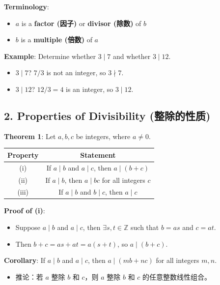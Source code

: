 \documentclass[10pt,a4paper,openany]{ctexbook}
\theoremstyle{definition}
\theoremstyle{remark}
\begin{document}
\textbf{Terminology}:
\begin{itemize}
\item $a$ is a \textbf{factor (因子)} or \textbf{divisor (除数)} of $b$
\item $b$ is a \textbf{multiple (倍数)} of $a$

\end{itemize}

\textbf{Example}: Determine whether $3 \mid 7$ and whether $3 \mid 12$.
\begin{itemize}
\item $3 \mid 7$? $7/3$ is not an integer, so $3 \nmid 7$.
\item $3 \mid 12$? $12/3 = 4$ is an integer, so $3 \mid 12$.

\end{itemize}

\vspace{-2pt}

\subsection{2. Properties of Divisibility (整除的性质)}

\textbf{Theorem 1}: Let $a, b, c$ be integers, where $a \neq 0$.
\begin{center}
\begin{tabular}{cc}
\hline
Property & Statement \\ \hline
(i) & If $a \mid b$ and $a \mid c$, then $a \mid (b + c)$ \\
(ii) & If $a \mid b$, then $a \mid bc$ for all integers $c$ \\
(iii) & If $a \mid b$ and $b \mid c$, then $a \mid c$ \\
\hline
\end{tabular}

\end{center}

\textbf{Proof of (i)}:
\begin{itemize}
\item Suppose $a \mid b$ and $a \mid c$, then $\exists s, t \in \mathbb{Z}$ such that $b = as$ and $c = at$.
\item Then $b + c = as + at = a(s + t)$, so $a \mid (b + c)$.

\end{itemize}

\textbf{Corollary}: If $a \mid b$ and $a \mid c$, then $a \mid (mb + nc)$ for all integers $m, n$.
\begin{itemize}
\item 推论：若 $a$ 整除 $b$ 和 $c$，则 $a$ 整除 $b$ 和 $c$ 的任意整数线性组合。

\end{itemize}
\end{document}
